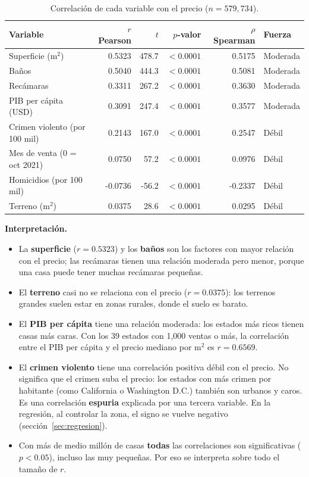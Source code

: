 \documentclass[12pt,letterpaper]{article}
\begin{document}
\begin{table}[H]
\centering
\caption{Correlación de cada variable con el precio ($n = 579,734$).}
\small
\begin{tabular}{lrrrrl}
\toprule
Variable & $r$ Pearson & $t$ & $p$-valor & $\rho$ Spearman & Fuerza \\
\midrule
Superficie (m$^2$) & 0.5323 & 478.7 & $<0.0001$ & 0.5175 & Moderada \\
Baños & 0.5040 & 444.3 & $<0.0001$ & 0.5081 & Moderada \\
Recámaras & 0.3311 & 267.2 & $<0.0001$ & 0.3630 & Moderada \\
PIB per cápita (USD) & 0.3091 & 247.4 & $<0.0001$ & 0.3577 & Moderada \\
Crimen violento (por 100 mil) & 0.2143 & 167.0 & $<0.0001$ & 0.2547 & Débil \\
Mes de venta (0 = oct 2021) & 0.0750 & 57.2 & $<0.0001$ & 0.0976 & Débil \\
Homicidios (por 100 mil) & -0.0736 & -56.2 & $<0.0001$ & -0.2337 & Débil \\
Terreno (m$^2$) & 0.0375 & 28.6 & $<0.0001$ & 0.0295 & Débil \\
\bottomrule
\end{tabular}
\end{table}

\textbf{Interpretación.}
\begin{itemize}[nosep]
  \item La \textbf{superficie} ($r = 0.5323$) y los \textbf{baños} son los factores con mayor relación con el precio; las recámaras tienen una relación moderada pero menor, porque una casa puede tener muchas recámaras pequeñas.
  \item El \textbf{terreno} casi no se relaciona con el precio ($r = 0.0375$): los terrenos grandes suelen estar en zonas rurales, donde el suelo es barato.
  \item El \textbf{PIB per cápita} tiene una relación moderada: los estados más ricos tienen casas más caras. Con los 39 estados con 1,000 ventas o más, la correlación entre el PIB per cápita y el precio mediano por m$^2$ es $r = 0.6569$.
  \item El \textbf{crimen violento} tiene una correlación positiva débil con el precio. No significa que el crimen suba el precio: los estados con más crimen por habitante (como California o Washington D.C.) también son urbanos y caros. Es una correlación \textbf{espuria} explicada por una tercera variable. En la regresión, al controlar la zona, el signo se vuelve negativo (sección~\ref{sec:regresion}).
  \item Con más de medio millón de casas \textbf{todas} las correlaciones son significativas ($p < 0.05$), incluso las muy pequeñas. Por eso se interpreta sobre todo el tamaño de $r$.
\end{itemize}
\end{document}
